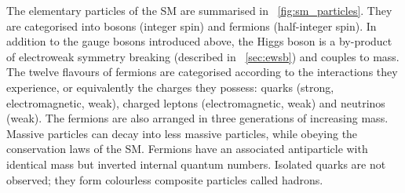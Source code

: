 The elementary particles of the \ac{SM} are summarised in \Figure~\ref{fig:sm_particles}.
They are categorised into bosons (integer spin) and fermions (half-integer spin).
In addition to the gauge bosons introduced above, the Higgs boson is a by-product
of electroweak symmetry breaking (described in \Section~\ref{sec:ewsb}) and couples to 
mass. The twelve flavours of fermions are categorised according to the interactions they 
experience, or equivalently the charges they possess: quarks (strong, electromagnetic, 
weak), charged leptons (electromagnetic, weak) and neutrinos (weak). The fermions are also 
arranged in three generations of increasing mass. Massive particles can decay into less 
massive particles, while obeying the conservation laws of the \ac{SM}. Fermions have an 
associated antiparticle with identical mass but inverted internal quantum numbers.
Isolated quarks are not observed; they form colourless composite particles called hadrons.
